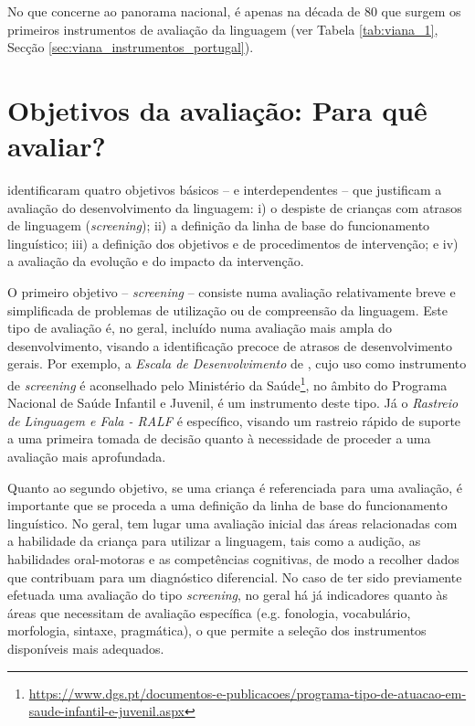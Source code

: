 \documentclass[output=paper]{LSP/langsci}
\begin{document}
No que concerne ao panorama nacional, é apenas na década de 80 que surgem os primeiros instrumentos de avaliação da linguagem (ver Tabela \ref{tab:viana_1}, Secção \ref{sec:viana_instrumentos_portugal}).

\section{Objetivos da avaliação: Para quê avaliar?}
\label{sec:viana_para_que}

\citet{westby_etal1996} identificaram quatro objetivos básicos – e interdependentes – que justificam a avaliação do desenvolvimento da linguagem: i) o despiste de crianças com atrasos de linguagem (\textit{screening}); ii) a definição da linha de base do funcionamento linguístico; iii) a definição dos objetivos e de procedimentos de intervenção; e iv) a avaliação da evolução e do impacto da intervenção.

O primeiro objetivo – \textit{screening} – consiste numa avaliação relativamente breve e simplificada de problemas de utilização ou de compreensão da linguagem. Este tipo de avaliação é, no geral, incluído numa avaliação mais ampla do desenvolvimento, visando a identificação precoce de atrasos de desenvolvimento gerais. Por exemplo, a \textit{Escala de Desenvolvimento} de \citet{sheridan2007}, cujo uso como instrumento de \textit{screening} é aconselhado pelo Ministério da Saúde\footnote{\url{https://www.dgs.pt/documentos-e-publicacoes/programa-tipo-de-atuacao-em-saude-infantil-e-juvenil.aspx}}, no âmbito do Programa Nacional de Saúde Infantil e Juvenil, é um instrumento deste tipo. Já o \textit{Rastreio de Linguagem e Fala - RALF} \citep{mendes_etal2015} é específico, visando um rastreio rápido de suporte a uma primeira tomada de decisão quanto à necessidade de proceder a uma avaliação mais aprofundada.

Quanto ao segundo objetivo, se uma criança é referenciada para uma avaliação, é importante que se proceda a uma definição da linha de base do funcionamento linguístico. No geral, tem lugar uma avaliação inicial das áreas relacionadas com a habilidade da criança para utilizar a linguagem, tais como a audição, as habilidades oral-motoras e as competências cognitivas, de modo a recolher dados que contribuam para um diagnóstico diferencial. No caso de ter sido previamente efetuada uma avaliação do tipo \textit{screening}, no geral há já indicadores quanto às áreas que necessitam de avaliação específica (e.g. fonologia, vocabulário, morfologia, sintaxe, pragmática), o que permite a seleção dos instrumentos disponíveis mais adequados.
\end{document}
